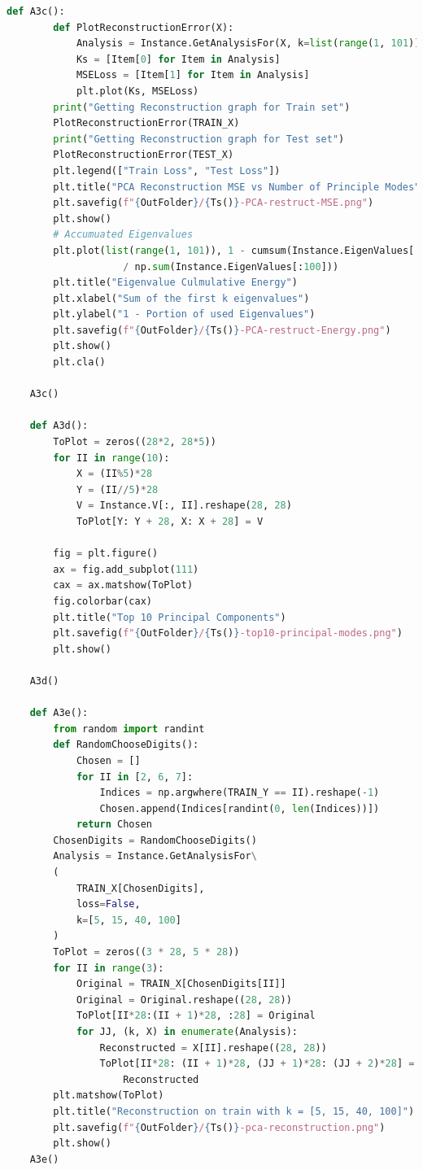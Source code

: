 \documentclass[]{article}
\begin{document}
\begin{lstlisting}[language=python]
    def A3c():
        def PlotReconstructionError(X):
            Analysis = Instance.GetAnalysisFor(X, k=list(range(1, 101)))
            Ks = [Item[0] for Item in Analysis]
            MSELoss = [Item[1] for Item in Analysis]
            plt.plot(Ks, MSELoss)
        print("Getting Reconstruction graph for Train set")
        PlotReconstructionError(TRAIN_X)
        print("Getting Reconstruction graph for Test set")
        PlotReconstructionError(TEST_X)
        plt.legend(["Train Loss", "Test Loss"])
        plt.title("PCA Reconstruction MSE vs Number of Principle Modes")
        plt.savefig(f"{OutFolder}/{Ts()}-PCA-restruct-MSE.png")
        plt.show()
        # Accumuated Eigenvalues
        plt.plot(list(range(1, 101)), 1 - cumsum(Instance.EigenValues[:100])
                    / np.sum(Instance.EigenValues[:100]))
        plt.title("Eigenvalue Culmulative Energy")
        plt.xlabel("Sum of the first k eigenvalues")
        plt.ylabel("1 - Portion of used Eigenvalues")
        plt.savefig(f"{OutFolder}/{Ts()}-PCA-restruct-Energy.png")
        plt.show()
        plt.cla()

    A3c()

    def A3d():
        ToPlot = zeros((28*2, 28*5))
        for II in range(10):
            X = (II%5)*28
            Y = (II//5)*28
            V = Instance.V[:, II].reshape(28, 28)
            ToPlot[Y: Y + 28, X: X + 28] = V

        fig = plt.figure()
        ax = fig.add_subplot(111)
        cax = ax.matshow(ToPlot)
        fig.colorbar(cax)
        plt.title("Top 10 Principal Components")
        plt.savefig(f"{OutFolder}/{Ts()}-top10-principal-modes.png")
        plt.show()

    A3d()

    def A3e():
        from random import randint
        def RandomChooseDigits():
            Chosen = []
            for II in [2, 6, 7]:
                Indices = np.argwhere(TRAIN_Y == II).reshape(-1)
                Chosen.append(Indices[randint(0, len(Indices))])
            return Chosen
        ChosenDigits = RandomChooseDigits()
        Analysis = Instance.GetAnalysisFor\
        (
            TRAIN_X[ChosenDigits],
            loss=False,
            k=[5, 15, 40, 100]
        )
        ToPlot = zeros((3 * 28, 5 * 28))
        for II in range(3):
            Original = TRAIN_X[ChosenDigits[II]]
            Original = Original.reshape((28, 28))
            ToPlot[II*28:(II + 1)*28, :28] = Original
            for JJ, (k, X) in enumerate(Analysis):
                Reconstructed = X[II].reshape((28, 28))
                ToPlot[II*28: (II + 1)*28, (JJ + 1)*28: (JJ + 2)*28] = \
                    Reconstructed
        plt.matshow(ToPlot)
        plt.title("Reconstruction on train with k = [5, 15, 40, 100]")
        plt.savefig(f"{OutFolder}/{Ts()}-pca-reconstruction.png")
        plt.show()
    A3e()


\end{lstlisting}
\end{document}
